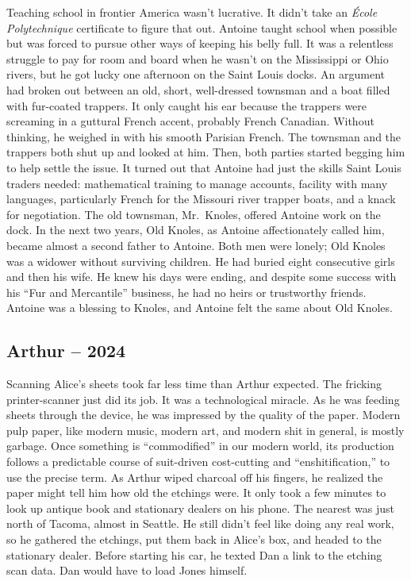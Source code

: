 Teaching school in frontier America wasn't lucrative. It didn't take an
\emph{École Polytechnique} certificate to figure that out. Antoine
taught school when possible but was forced to pursue other ways of
keeping his belly full. It was a relentless struggle to pay for room and
board when he wasn't on the Mississippi or Ohio rivers, but he got lucky
one afternoon on the Saint Louis docks. An argument had broken out
between an old, short, well-dressed townsman and a boat filled with
fur-coated trappers. It only caught his ear because the trappers were
screaming in a guttural French accent, probably French Canadian. Without
thinking, he weighed in with his smooth Parisian French. The townsman
and the trappers both shut up and looked at him. Then, both parties
started begging him to help settle the issue. It turned out that Antoine
had just the skills Saint Louis traders needed: mathematical training to
manage accounts, facility with many languages, particularly French for
the Missouri river trapper boats, and a knack for negotiation. The old
townsman, Mr.~Knoles, offered Antoine work on the dock. In the next two
years, Old Knoles, as Antoine affectionately called him, became almost a
second father to Antoine. Both men were lonely; Old Knoles was a widower
without surviving children. He had buried eight consecutive girls and
then his wife. He knew his days were ending, and despite some success
with his ``Fur and Mercantile'' business, he had no heirs or trustworthy
friends. Antoine was a blessing to Knoles, and Antoine felt the same
about Old Knoles.

\hypertarget{arthur-2024-2}{%
\subsection*{Arthur -- 2024}\label{arthur-2024-2}}

Scanning Alice's sheets took far less time than Arthur expected. The
fricking printer-scanner just did its job. It was a technological
miracle. As he was feeding sheets through the device, he was impressed
by the quality of the paper. Modern pulp paper, like modern music,
modern art, and modern shit in general, is mostly garbage. Once
something is ``commodified'' in our modern world, its production follows
a predictable course of suit-driven cost-cutting and
``enshitification,'' to use the precise term. As Arthur wiped charcoal
off his fingers, he realized the paper might tell him how old the
etchings were. It only took a few minutes to look up antique book and
stationary dealers on his phone. The nearest was just north of Tacoma,
almost in Seattle. He still didn't feel like doing any real work, so he
gathered the etchings, put them back in Alice's box, and headed to the
stationary dealer. Before starting his car, he texted Dan a link to the
etching scan data. Dan would have to load Jones himself.

